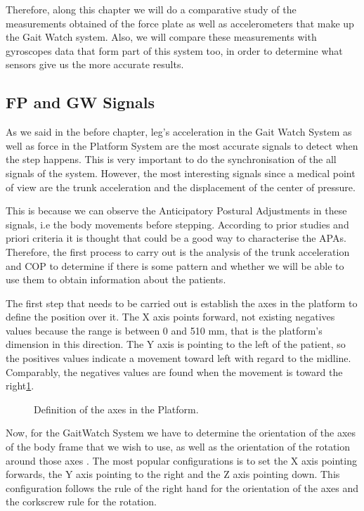 Therefore, along this chapter we will do a comparative study of the measurements obtained of the force plate as well as accelerometers that make up the Gait Watch system. Also, we will compare these measurements with gyroscopes data that form part of this system too, in order to determine what sensors give us the more accurate results.

\subsection{FP and GW Signals}
As we said in the before chapter, leg's acceleration in the Gait Watch System as well as force in the Platform System are the most accurate signals to detect when the step happens. This is very important to do the synchronisation of the all signals of the system. However, the most interesting signals since a medical point of view are the trunk acceleration and the displacement of the center of pressure.

This is because we can observe the Anticipatory Postural Adjustments in these signals, i.e the body movements before stepping. According to prior studies and priori criteria it is thought that could be a good way to characterise the APAs.
Therefore, the first process to carry out is the analysis of the trunk acceleration and COP to determine if there is some pattern and whether we will be able to use them to obtain information about the patients.

The first step that needs to be carried out is establish the axes in the platform to define the position over it. The X axis points forward, not existing negatives values because the range is between 0 and 510 mm, that is the platform’s dimension in this direction. The Y axis is pointing to the left of the patient, so the positives values indicate a movement toward left with regard to the midline. Comparably, the negatives values are found when the movement is toward the right\ref{fig:axesFP}.

\begin{figure}[H]
	\centering
	\caption{Definition of the axes in the Platform.}
	\label{fig:axesFP}
\end{figure}

Now, for the GaitWatch System we have to determine the orientation of the axes of the body frame that we wish to use, as well as the orientation of the rotation around those axes . The most popular configurations is to set the X axis pointing forwards, the Y axis pointing to the right and the Z axis pointing down. This configuration follows the rule of the right hand for the orientation of the axes and the corkscrew rule for the rotation. \cite{OlivaresBotzel2013}


